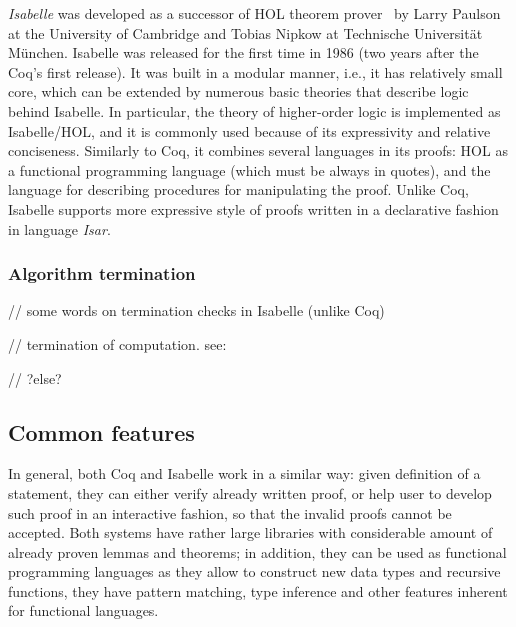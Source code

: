 \documentclass[article]{aaltoseries}
\begin{document}
\textit{Isabelle} was developed as a successor of HOL theorem prover~\cite{tool_HOL} by Larry Paulson at the University of Cambridge and Tobias Nipkow at Technische Universität München. Isabelle was released for the first time in 1986 (two years after the Coq's first release). It was built in a modular manner, i.e., it has relatively small core, which can be extended by numerous basic theories that describe logic behind Isabelle. In particular, the theory of higher-order logic is implemented as Isabelle/HOL, and it is commonly used because of its expressivity and relative conciseness. Similarly to Coq, it combines several languages in its proofs: HOL as a functional programming language (which must be always in quotes), and the language for describing procedures for manipulating the proof. Unlike Coq, Isabelle supports more expressive style of proofs written in a declarative fashion in language \textit{Isar}.


\subsubsection{Algorithm termination}
// some words on termination checks in Isabelle (unlike Coq)

// termination of computation. see: %

// ?else?



\subsection{Common features}

In general, both Coq and Isabelle work in a similar way: given definition of a statement, they can either verify already written proof, or help user to develop such proof in an interactive fashion, so that the invalid proofs cannot be accepted. Both systems have rather large libraries with considerable amount of already proven lemmas and theorems; in addition, they can be used as functional programming languages as they allow to construct new data types and recursive functions, they have pattern matching, type inference and other features inherent for functional languages.
\end{document}
